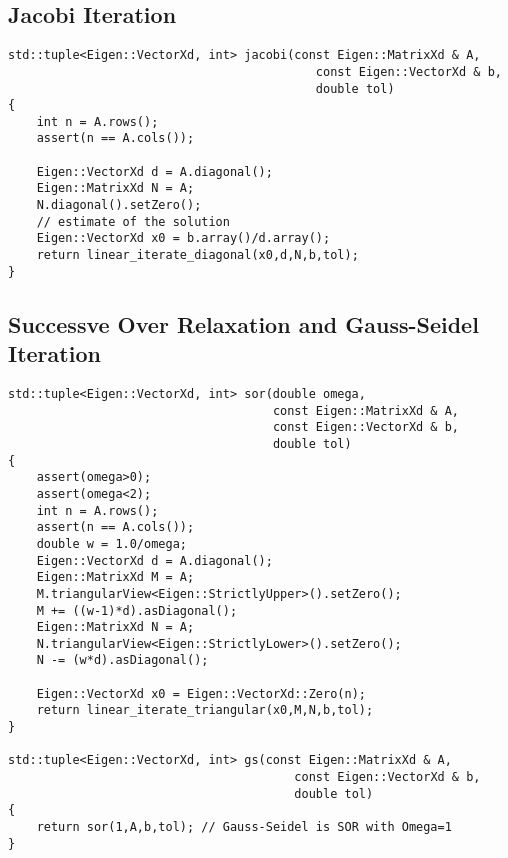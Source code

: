 \documentclass[paper=a4, fontsize=11pt]{scrartcl} %
\numberwithin{equation}{section} %
\numberwithin{figure}{section} %
\numberwithin{table}{section} %
\begin{document}
\newpage

\subsection{Jacobi Iteration}
\begin{lstlisting}
std::tuple<Eigen::VectorXd, int> jacobi(const Eigen::MatrixXd & A, 
                                           const Eigen::VectorXd & b,
                                           double tol)
{
    int n = A.rows();
    assert(n == A.cols());

    Eigen::VectorXd d = A.diagonal();
    Eigen::MatrixXd N = A;
    N.diagonal().setZero();
    // estimate of the solution 
    Eigen::VectorXd x0 = b.array()/d.array();
    return linear_iterate_diagonal(x0,d,N,b,tol);
}
\end{lstlisting}

\subsection{Successve Over Relaxation and Gauss-Seidel Iteration}
\begin{lstlisting}
std::tuple<Eigen::VectorXd, int> sor(double omega,
                                     const Eigen::MatrixXd & A, 
                                     const Eigen::VectorXd & b,
                                     double tol)
{
    assert(omega>0);
    assert(omega<2);
    int n = A.rows();
    assert(n == A.cols());
    double w = 1.0/omega;
    Eigen::VectorXd d = A.diagonal();
    Eigen::MatrixXd M = A; 
    M.triangularView<Eigen::StrictlyUpper>().setZero();
    M += ((w-1)*d).asDiagonal();
    Eigen::MatrixXd N = A;
    N.triangularView<Eigen::StrictlyLower>().setZero();
    N -= (w*d).asDiagonal();

    Eigen::VectorXd x0 = Eigen::VectorXd::Zero(n);
    return linear_iterate_triangular(x0,M,N,b,tol);
}

std::tuple<Eigen::VectorXd, int> gs(const Eigen::MatrixXd & A, 
                                        const Eigen::VectorXd & b,
                                        double tol)
{
    return sor(1,A,b,tol); // Gauss-Seidel is SOR with Omega=1
}
\end{lstlisting}
\end{document}

